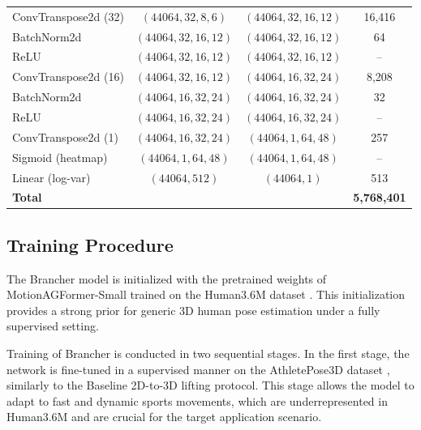 \begin{table}[H]
\begin{tabular}{lccc}
    ConvTranspose2d (32) & $(44064,32,8,6)$ & $(44064,32,16,12)$ & 16,416 \\
    BatchNorm2d & $(44064,32,16,12)$ & $(44064,32,16,12)$ & 64 \\
    ReLU & $(44064,32,16,12)$ & $(44064,32,16,12)$ & -- \\
    ConvTranspose2d (16) & $(44064,32,16,12)$ & $(44064,16,32,24)$ & 8,208 \\
    BatchNorm2d & $(44064,16,32,24)$ & $(44064,16,32,24)$ & 32 \\
    ReLU & $(44064,16,32,24)$ & $(44064,16,32,24)$ & -- \\
    ConvTranspose2d (1) & $(44064,16,32,24)$ & $(44064,1,64,48)$ & 257 \\
    Sigmoid (heatmap) & $(44064,1,64,48)$ & $(44064,1,64,48)$ & -- \\
    Linear (log-var) & $(44064,512)$ & $(44064,1)$ & 513 \\
    \hline
    \textbf{Total} & & & \textbf{5,768,401} \\
    \hline
    \end{tabular}
\end{table}



\subsection{Training Procedure}
The Brancher model is initialized with the pretrained weights of MotionAGFormer-Small \cite{mehraban2024motionagformer} trained on the Human3.6M dataset \cite{ionescu2013human3}. This initialization provides a strong prior for generic 
3D human pose estimation under a fully supervised setting.

Training of Brancher is conducted in two sequential stages. In the first stage, the network is fine-tuned in a supervised manner on the AthletePose3D dataset \cite{yeung2025athletepose3d}, similarly to the Baseline 2D-to-3D lifting
protocol. This stage allows the model to adapt to fast and dynamic sports movements, which are underrepresented in Human3.6M and are crucial for the target application scenario.

